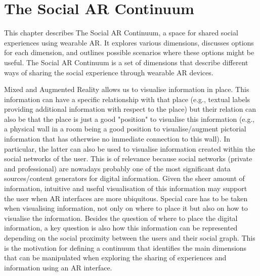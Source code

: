 \chapter{The Social AR Continuum}
\label{ch:continuum}

This chapter describes The Social AR Continuum, a space for shared social experiences using wearable AR. It explores various dimensions, discusses options for each dimension, and outlines possible scenarios where these options might be useful. The Social AR Continuum is a set of dimensions that describe different ways of sharing the social experience through wearable AR devices. 

Mixed and Augmented Reality allows us to visualise information in place. This information can have a specific relationship with that place (e.g., textual labels providing additional information with respect to the place) but their relation can also be that the place is just a good "position" to visualise this information (e.g., a physical wall in a room being a good position to visualise/augment pictorial information that has otherwise no immediate connection to this wall). In particular, the latter can also be used to visualise information created within the social networks of the user. This is of relevance because social networks (private and professional) are nowadays probably one of the most significant data sources/content generators for digital information. Given the sheer amount of information, intuitive and useful visualisation of this information may support the user when AR interfaces are more ubiquitous. Special care has to be taken when visualising information, not only on where to place it but also on how to visualise the information. Besides the question of where to place the digital information, a key question is also how this information can be represented depending on the social proximity between the users and their social graph. This is the motivation for defining a continuum that identifies the main dimensions that can be manipulated when exploring the sharing of experiences and information using an AR interface. 



